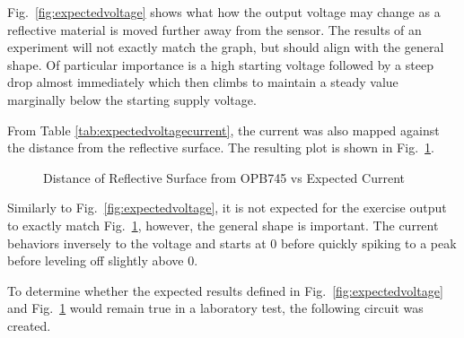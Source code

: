 \documentclass[conference]{IEEEtran}
\begin{document}
Fig.~\ref{fig:expectedvoltage} shows what how the output voltage may change as a reflective material is moved further away from the
sensor. The results of an experiment will not exactly match the graph, but should align with the general shape. Of particular
importance is a high starting voltage followed by a steep drop almost immediately which then climbs to maintain a steady value
marginally below the starting supply voltage.

From Table \ref{tab:expectedvoltagecurrent}, the current was also mapped against the distance from the reflective surface.
The resulting plot is shown in Fig.~\ref{fig:expectedcurrent}.

\begin{figure}[htbp]
    \caption{Distance of Reflective Surface from OPB745 vs Expected Current}
    \label{fig:expectedcurrent}
\end{figure}

Similarly to Fig.~\ref{fig:expectedvoltage}, it is not expected for the exercise output to exactly match 
Fig.~\ref{fig:expectedcurrent}, however, the general shape is important. The current behaviors inversely to the
voltage and starts at 0 before quickly spiking to a peak before leveling off slightly above 0.

To determine whether the expected results defined in Fig.~\ref{fig:expectedvoltage} and Fig.~\ref{fig:expectedcurrent} would remain true
in a laboratory test, the following circuit was created.
\end{document}
